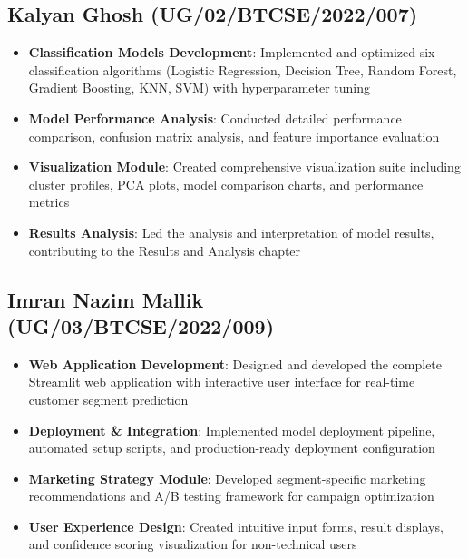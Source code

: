 \documentclass[12pt,a4paper]{report}
\begin{document}
\subsection*{Kalyan Ghosh (UG/02/BTCSE/2022/007)}
\begin{itemize}
    \item \textbf{Classification Models Development}: Implemented and optimized six classification algorithms (Logistic Regression, Decision Tree, Random Forest, Gradient Boosting, KNN, SVM) with hyperparameter tuning
    \item \textbf{Model Performance Analysis}: Conducted detailed performance comparison, confusion matrix analysis, and feature importance evaluation
    \item \textbf{Visualization Module}: Created comprehensive visualization suite including cluster profiles, PCA plots, model comparison charts, and performance metrics
    \item \textbf{Results Analysis}: Led the analysis and interpretation of model results, contributing to the Results and Analysis chapter
\end{itemize}

\subsection*{Imran Nazim Mallik (UG/03/BTCSE/2022/009)}
\begin{itemize}
    \item \textbf{Web Application Development}: Designed and developed the complete Streamlit web application with interactive user interface for real-time customer segment prediction
    \item \textbf{Deployment \& Integration}: Implemented model deployment pipeline, automated setup scripts, and production-ready deployment configuration
    \item \textbf{Marketing Strategy Module}: Developed segment-specific marketing recommendations and A/B testing framework for campaign optimization
    \item \textbf{User Experience Design}: Created intuitive input forms, result displays, and confidence scoring visualization for non-technical users
\end{itemize}
\end{document}
